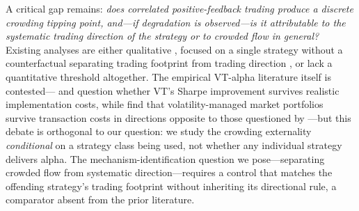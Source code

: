 \documentclass[12pt,a4paper]{article}
\begin{document}
A critical gap remains: \emph{does correlated positive-feedback trading produce a discrete crowding tipping point, and---if degradation is observed---is it attributable to the systematic trading direction of the strategy or to crowded flow in general?} Existing analyses are either qualitative \citep{ecb2020}, focused on a single strategy without a counterfactual separating trading footprint from trading direction \citep{baltas2019}, or lack a quantitative threshold altogether. The empirical VT-alpha literature itself is contested---\citet{cederburg2020} and \citet{liu2019} question whether VT's Sharpe improvement survives realistic implementation costs, while \citet{barroso2021} find that volatility-managed market portfolios survive transaction costs in directions opposite to those questioned by \citet{cederburg2020}---but this debate is orthogonal to our question: we study the crowding externality \emph{conditional} on a strategy class being used, not whether any individual strategy delivers alpha. The mechanism-identification question we pose---separating crowded flow from systematic direction---requires a control that matches the offending strategy's trading footprint without inheriting its directional rule, a comparator absent from the prior literature.
\end{document}
